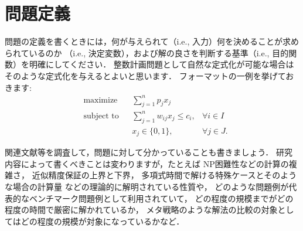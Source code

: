 \chapter{問題定義}\label{definition}
問題の定義を書くときには，何が与えられて（i.e., 入力）何を決めることが求められているのか
（i.e., 決定変数），および解の良さを判断する基準（i.e., 目的関数）を明確にしてください．
整数計画問題として自然な定式化が可能な場合はそのような定式化を与えるとよいと思います．
フォーマットの一例を挙げておきます:
\begin{align*}
 &\textrm{maximize}   && \sum_{j=1}^n p_j x_j \\
 &\textrm{subject to} && \sum_{j=1}^n w_{ij} x_j \le c_i, & \forall i \in I \\
 &                    && x_j \in \{0, 1\},                & \forall j \in J.
\end{align*}

関連文献等を調査して，問題に対して分かっていることも書きましょう．
研究内容によって書くべきことは変わりますが，たとえば
NP困難性などの計算の複雑さ，
近似精度保証の上界と下界，
多項式時間で解ける特殊ケースとそのような場合の計算量
などの理論的に解明されている性質や，
どのような問題例が代表的なベンチマーク問題例として利用されていて，
どの程度の規模までがどの程度の時間で厳密に解かれているか，
メタ戦略のような解法の比較の対象としてはどの程度の規模が対象になっているかなど．